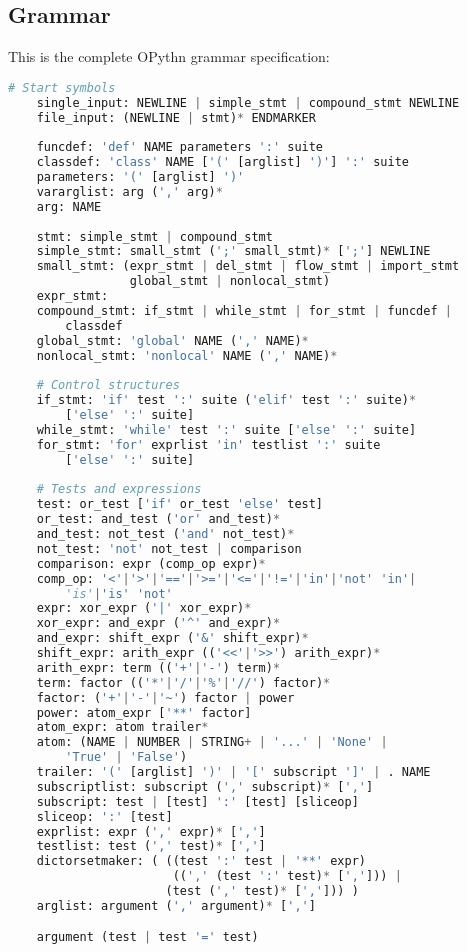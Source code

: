 \documentclass[11pt, twoside]{article}
\begin{document}
    \subsection{Grammar}
    This is the complete OPythn grammar specification:
    \begin{lstlisting}[language=python]
    # Start symbols
    single_input: NEWLINE | simple_stmt | compound_stmt NEWLINE
    file_input: (NEWLINE | stmt)* ENDMARKER
    
    funcdef: 'def' NAME parameters ':' suite
    classdef: 'class' NAME ['(' [arglist] ')'] ':' suite
    parameters: '(' [arglist] ')'
    vararglist: arg (',' arg)*
    arg: NAME
    
    stmt: simple_stmt | compound_stmt
    simple_stmt: small_stmt (';' small_stmt)* [';'] NEWLINE
    small_stmt: (expr_stmt | del_stmt | flow_stmt | import_stmt
                 global_stmt | nonlocal_stmt)
    expr_stmt:  
    compound_stmt: if_stmt | while_stmt | for_stmt | funcdef |
        classdef
    global_stmt: 'global' NAME (',' NAME)*
    nonlocal_stmt: 'nonlocal' NAME (',' NAME)*
    
    # Control structures
    if_stmt: 'if' test ':' suite ('elif' test ':' suite)*
        ['else' ':' suite]
    while_stmt: 'while' test ':' suite ['else' ':' suite]
    for_stmt: 'for' exprlist 'in' testlist ':' suite
        ['else' ':' suite]
    
    # Tests and expressions
    test: or_test ['if' or_test 'else' test]
    or_test: and_test ('or' and_test)*
    and_test: not_test ('and' not_test)*
    not_test: 'not' not_test | comparison
    comparison: expr (comp_op expr)*
    comp_op: '<'|'>'|'=='|'>='|'<='|'!='|'in'|'not' 'in'|
        'is'|'is' 'not'
    expr: xor_expr ('|' xor_expr)*
    xor_expr: and_expr ('^' and_expr)*
    and_expr: shift_expr ('&' shift_expr)*
    shift_expr: arith_expr (('<<'|'>>') arith_expr)*
    arith_expr: term (('+'|'-') term)*
    term: factor (('*'|'/'|'%'|'//') factor)*
    factor: ('+'|'-'|'~') factor | power
    power: atom_expr ['**' factor]
    atom_expr: atom trailer*
    atom: (NAME | NUMBER | STRING+ | '...' | 'None' |
        'True' | 'False')
    trailer: '(' [arglist] ')' | '[' subscript ']' | . NAME
    subscriptlist: subscript (',' subscript)* [',']
    subscript: test | [test] ':' [test] [sliceop]
    sliceop: ':' [test]
    exprlist: expr (',' expr)* [',']
    testlist: test (',' test)* [',']
    dictorsetmaker: ( ((test ':' test | '**' expr)
                       ((',' (test ':' test)* [','])) |
                      (test (',' test)* [','])) )
    arglist: argument (',' argument)* [',']

    argument (test | test '=' test)
    \end{lstlisting}
\end{document}
